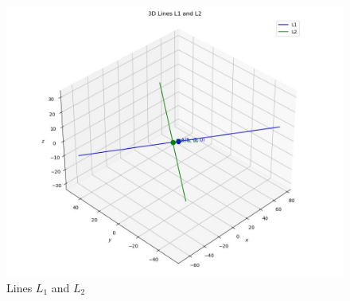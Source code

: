 \documentclass[journal]{IEEEtran}
\begin{document}
\begin{figure}
    \centering
    \includegraphics[width=\columnwidth]{figs/plot_c.jpg}
    \caption*{Lines $L_1$ and $L_2$}
    \label{fig:fig}
\end{figure}
\end{document}
